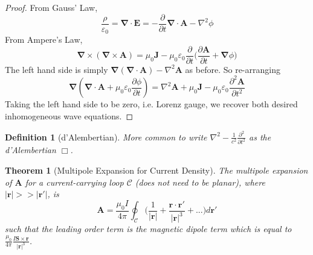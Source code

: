 \documentclass[a4paper]{article}
\theoremstyle{new}
\newtheorem{defi}{Definition}[section]
\newtheorem{thm}{Theorem}[section]
\begin{document}
\begin{proof}
From Gauss' Law,
$$\frac{\rho}{\varepsilon_0}=\boldsymbol{\nabla}\cdot\mathbf{E}=-\frac{\partial}{\partial t}\boldsymbol{\nabla}\cdot\mathbf{A}-\nabla^2\phi$$
From Ampere's Law,
$$\boldsymbol{\nabla}\times(\boldsymbol{\nabla}\times\mathbf{A})=\mu_0\mathbf{J}-\mu_0\varepsilon_0\frac{\partial}{\partial t}\bigg(\frac{\partial\mathbf{A}}{\partial t}+\boldsymbol{\nabla}\phi\bigg)$$
The left hand side is simply $\boldsymbol{\nabla}(\boldsymbol{\nabla}\cdot\mathbf{A})-\nabla^2\mathbf{A}$ as before. So re-arranging
$$\boldsymbol{\nabla}(\boldsymbol{\nabla}\cdot\mathbf{A}+\mu_0\varepsilon_0\frac{\partial\phi}{\partial t})=\nabla^2\mathbf{A}+\mu_0\mathbf{J}-\mu_0\varepsilon_0\frac{\partial^2\mathbf{A}}{\partial t^2}$$
Taking the left hand side to be zero, i.e. Lorenz gauge, we recover both desired inhomogeneous wave equations.
\end{proof}
\begin{defi}[d'Alembertian]
More common to write  $\nabla^2-\frac{1}{c^2}\frac{\partial^2}{\partial t^2}$ as the d'Alembertian $\Box$.
\end{defi}
\begin{thm}[Multipole Expansion for Current Density]
The multipole expansion of $\mathbf{A}$ for a current-carrying loop $\mathcal{C}$ (does not need to be planar), where $|\mathbf{r}|>>|\mathbf{r'}|$, is
$$\mathbf{A}=\frac{\mu_0I}{4\pi}\oint_{\mathcal{C}}\bigg(\frac{1}{|\mathbf{r}|}+\frac{\mathbf{r}\cdot\mathbf{r'}}{|\mathbf{r}|^3}+...\bigg)d\mathbf{r'}$$
such that the leading order term is the magnetic dipole term which is equal to $\frac{\mu_0}{4\pi}\frac{I\mathbf{S}\times\mathbf{r}}{|\mathbf{r}|^3}$. 
\end{thm}
\end{document}
